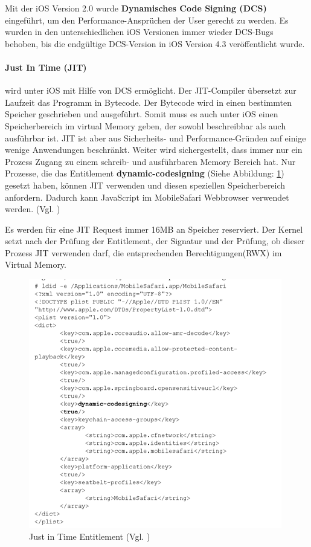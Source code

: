 Mit der iOS Version 2.0 wurde \textbf{Dynamisches Code Signing (DCS)} eingeführt, um den Performance-Ansprüchen der User gerecht zu werden. Es wurden in den unterschiedlichen iOS Versionen immer wieder DCS-Bugs behoben, bis die endgültige DCS-Version in iOS Version 4.3 veröffentlicht wurde. 
\paragraph{Just In Time (JIT)} wird unter iOS mit Hilfe von DCS ermöglicht. Der JIT-Compiler übersetzt zur Laufzeit das Programm in Bytecode. Der Bytecode wird in einen bestimmten Speicher geschrieben und ausgeführt. Somit muss es auch unter iOS einen Speicherbereich im virtual Memory geben, der sowohl beschreibbar als auch ausführbar ist.  JIT ist aber aus Sicherheits- und Performance-Gründen auf einige wenige Anwendungen beschränkt. Weiter wird sichergestellt, dass immer nur ein Prozess Zugang zu einem schreib- und ausführbaren Memory Bereich hat. Nur Prozesse, die das Entitlement \textbf{dynamic-codesigning} (Siehe Abbildung: \ref{fig:JIT}) gesetzt haben, können JIT verwenden und diesen speziellen Speicherbereich anfordern. Dadurch kann JavaScript im MobileSafari Webbrowser verwendet werden. (Vgl. \cite{JIT[1], ASLR[4]})

Es werden für eine JIT Request immer 16MB an Speicher reserviert. Der Kernel setzt nach der Prüfung der Entitlement, der Signatur und der Prüfung, ob dieser Prozess JIT verwenden darf, die entsprechenden Berechtigungen(RWX) im Virtual Memory.

\begin{figure}[htp!]
        \centering
                \includegraphics[scale=0.8]{JIT}
        \caption{Just in Time Entitlement (Vgl. \cite{Hacking[1]}) }
        \label{fig:JIT}
\end{figure}
